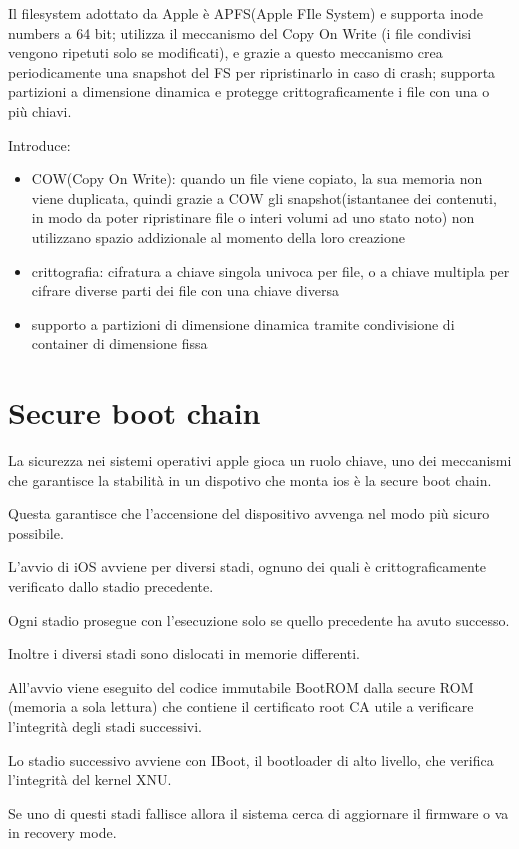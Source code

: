\documentclass{report}
\begin{document}
Il filesystem adottato da Apple è APFS(Apple FIle System) e supporta inode numbers a 64 bit; utilizza il meccanismo del Copy On Write (i file condivisi vengono ripetuti solo se modificati), e grazie a questo meccanismo crea periodicamente una snapshot del FS per ripristinarlo in caso di crash; supporta partizioni a dimensione dinamica e protegge crittograficamente i file con una o più chiavi.

Introduce:

\begin{itemize}
    \item COW(Copy On Write): quando un file viene copiato, la sua memoria non viene duplicata, quindi grazie a COW gli snapshot(istantanee dei contenuti, in modo da poter ripristinare file o interi volumi ad uno stato noto) non utilizzano spazio addizionale al momento della loro creazione
    \item crittografia: cifratura a chiave singola univoca per file, o a chiave multipla per cifrare diverse parti dei file con una chiave diversa
    \item supporto a partizioni di dimensione dinamica tramite condivisione di container di dimensione fissa
\end{itemize}
\section{Secure boot chain}
La sicurezza nei sistemi operativi apple gioca un ruolo chiave, uno dei meccanismi che garantisce la stabilità in un dispotivo che monta ios è la secure boot chain. 

Questa garantisce che l'accensione del dispositivo avvenga nel modo più sicuro possibile.

L’avvio di iOS avviene per diversi stadi, ognuno dei quali è crittograficamente verificato dallo stadio precedente.

Ogni stadio prosegue con l'esecuzione solo se quello precedente ha avuto successo.

Inoltre i diversi stadi sono dislocati in memorie differenti.

All’avvio viene eseguito del codice immutabile BootROM dalla secure ROM (memoria a sola lettura) che contiene il certificato root CA utile a verificare l'integrità degli stadi successivi.

Lo stadio successivo avviene con IBoot, il bootloader di alto livello, che verifica l’integrità del kernel XNU.

Se uno di questi stadi fallisce allora il sistema cerca di aggiornare il firmware o va in recovery mode.
\end{document}
